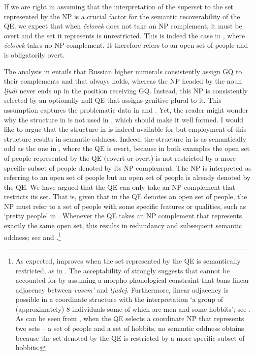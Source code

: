 \documentclass[output=paper,
modfonts,
newtxmath,
hidelinks
]{langscibook}
\begin{document}
If we are right in assuming that the interpretation of the superset to the set represented by the NP is a crucial factor for the semantic recoverability of the QE, we expect that when \textit{čelovek} does not take an NP complement, it must be overt and the set it represents is unrestricted. This is indeed the case in , where \textit{čelovek} takes no NP complement. It therefore refers to an open set of people and is obligatorily overt.

The analysis in  entails that Russian higher numerals consistently assign GQ to their complements and that  always holds, whereas the NP headed by the noun \textit{ljudi} never ends up in the position receiving GQ. Instead, this NP is consistently selected by an optionally null QE that assigns genitive plural to it. This assumption captures the problematic data in  and . Yet, the reader might wonder why the structure in  is not used in , which should make it well formed. I would like to argue that the structure in  is indeed available for  but employment of this structure results in semantic oddness. Indeed, the structure in  is as semantically odd as the one in , where the QE is overt, because in both examples the open set of people represented by the QE (covert or overt) is not restricted by a more specific subset of people denoted by its NP complement. The NP is interpreted as referring to an open set of people but an open set of people is already denoted by the QE. We have argued that the QE can only take an NP complement that restricts its set. That is, given that in  the QE denotes an open set of people, the NP must refer to a set of people with some specific features or qualities, such as ‘pretty people’ in . Whenever the QE takes an NP complement that represents exactly the same open set, this results in redundancy and subsequent semantic oddness; see  and .\footnote{\label{fn13}As expected,  improves when the set represented by the QE is semantically restricted, as in . The acceptability of  strongly suggests that  cannot be accounted for by assuming a morpho-phonological constraint that bans linear adjacency between \textit{vosem’} and \textit{ljudej.} Furthermore, linear adjacency is possible in a coordinate structure with the interpretation ‘a group of (approximately) 8 individuals some of which are men and some hobbits’; see . As can be seen from , when the QE selects a coordinate NP that represents two sets -- a set of people and a set of hobbits, no semantic oddness obtains because the set denoted by the QE is restricted by a more specific subset of hobbits.
\z

}
\end{document}
